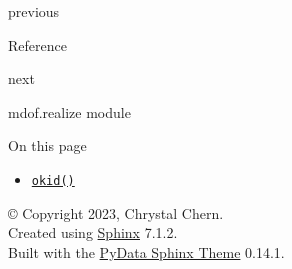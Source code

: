previous

Reference

\href{mdof.realize.html}{}

next

mdof.realize module

\emph{}

\emph{} On this page

\begin{itemize}
\tightlist
\item
  \protect\hyperlink{mdof.markov.okid}{\texttt{okid()}}
\end{itemize}

© Copyright 2023, Chrystal Chern.\\

Created using \href{https://www.sphinx-doc.org/}{Sphinx} 7.1.2.\\

Built with the
\href{https://pydata-sphinx-theme.readthedocs.io/en/stable/index.html}{PyData
Sphinx Theme} 0.14.1.
